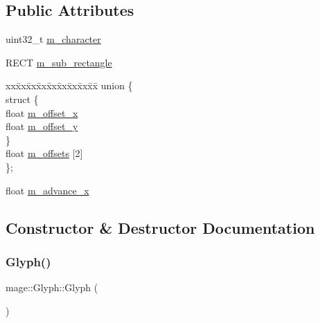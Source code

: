 \subsection*{Public Attributes}
\begin{DoxyCompactItemize}
\item 
uint32\+\_\+t \hyperlink{structmage_1_1_glyph_a1942f2164a6829dfbafe8fe09297b387}{m\+\_\+character}
\item 
R\+E\+CT \hyperlink{structmage_1_1_glyph_ac990dc92b5eebcc99da599f1a8d15bb4}{m\+\_\+sub\+\_\+rectangle}
\item 
\begin{tabbing}
xx\=xx\=xx\=xx\=xx\=xx\=xx\=xx\=xx\=\kill
union \{\\
\>struct \{\\
\>\>float \hyperlink{structmage_1_1_glyph_a13b8a2a17b96e317b5ae563668df7540}{m\_offset\_x}\\
\>\>float \hyperlink{structmage_1_1_glyph_ab3123f06cb1a27aaafa4fd6171a66a04}{m\_offset\_y}\\
\>\} \\
\>float \hyperlink{structmage_1_1_glyph_a0bd12df61a764922f6c9700f4b4a6a54}{m\_offsets} \mbox{[}2\mbox{]}\\
\}; \\

\end{tabbing}\item 
float \hyperlink{structmage_1_1_glyph_ab15dfce26541919696c1e6232d6c0cb6}{m\+\_\+advance\+\_\+x}
\end{DoxyCompactItemize}


\subsection{Constructor \& Destructor Documentation}
\hypertarget{structmage_1_1_glyph_a86e6c795e2aaad853f54270c709969a6}{}\label{structmage_1_1_glyph_a86e6c795e2aaad853f54270c709969a6} 
\subsubsection{\texorpdfstring{Glyph()}{Glyph()}\hspace{0.1cm}{\footnotesize\ttfamily [1/3]}}
{\footnotesize\ttfamily mage\+::\+Glyph\+::\+Glyph (\begin{DoxyParamCaption}{ }\end{DoxyParamCaption})\hspace{0.3cm}{\ttfamily [default]}}

